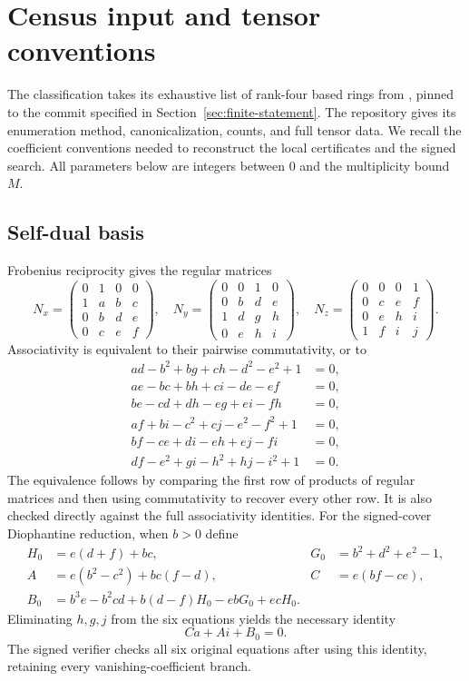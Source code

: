 \section{Census input and tensor conventions}\label{sec:census}
The classification takes its exhaustive list of rank-four based rings from
\cite{Census}, pinned to the commit specified in Section~\ref{sec:finite-statement}.
The repository gives its enumeration method, canonicalization, counts,
and full tensor data. We recall the coefficient conventions needed to
reconstruct the local certificates and the signed search. All parameters
below are integers between $0$ and the multiplicity bound $M$.

\subsection{Self-dual basis}
Frobenius reciprocity gives the regular matrices
\[
N_x=\begin{pmatrix}0&1&0&0\\1&a&b&c\\0&b&d&e\\0&c&e&f\end{pmatrix},\quad
N_y=\begin{pmatrix}0&0&1&0\\0&b&d&e\\1&d&g&h\\0&e&h&i\end{pmatrix},\quad
N_z=\begin{pmatrix}0&0&0&1\\0&c&e&f\\0&e&h&i\\1&f&i&j\end{pmatrix}.
\]
Associativity is equivalent to their pairwise commutativity, or to
\begin{align}
 ad-b^2+bg+ch-d^2-e^2+1&=0,\label{eq:census1}\\
 ae-bc+bh+ci-de-ef&=0,\label{eq:census2}\\
 be-cd+dh-eg+ei-fh&=0,\label{eq:census3}\\
 af+bi-c^2+cj-e^2-f^2+1&=0,\label{eq:census4}\\
 bf-ce+di-eh+ej-fi&=0,\label{eq:census5}\\
 df-e^2+gi-h^2+hj-i^2+1&=0.\label{eq:census6}
\end{align}
The equivalence follows by comparing the first row of products of regular
matrices and then using commutativity to recover every other row. It is
also checked directly against the full associativity identities.
For the signed-cover Diophantine reduction, when $b>0$ define
\begin{align*}
 H_0&=e(d+f)+bc,&G_0&=b^2+d^2+e^2-1,\\
 A&=e(b^2-c^2)+bc(f-d),&C&=e(bf-ce),\\
 B_0&=b^3e-b^2cd+b(d-f)H_0-ebG_0+ecH_0.
\end{align*}
Eliminating $h,g,j$ from the six equations yields the necessary identity
\begin{equation}\label{eq:census-linear}
 Ca+Ai+B_0=0.
\end{equation}
The signed verifier checks all six original equations after using this
identity, retaining every vanishing-coefficient branch.

